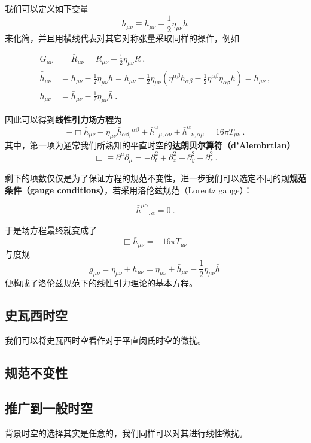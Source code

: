 我们可以定义如下变量
\begin{equation}
\bar{h}_{\mu\nu} \equiv h_{\mu\nu} - \frac{1}{2}\eta_{\mu\nu}h~
\end{equation}
来化简，并且用横线代表对其它对称张量采取同样的操作，例如

\begin{align}
G_{\mu\nu} &= \bar{R}_{\mu\nu} = R_{\mu\nu}- \frac{1}{2}\eta_{\mu\nu}R~,\\
\bar{\bar{h}}_{\mu\nu} &= \bar{h}_{\mu\nu} - \frac{1}{2}\eta_{\mu\nu}\bar{h} = \bar{h}_{\mu\nu} - \frac{1}{2}\eta_{\mu\nu} (\eta^{\alpha\beta}h_{\alpha\beta}-\frac{1}{2}\eta^{\alpha\beta}\eta_{\alpha\beta}h)= h_{\mu\nu}~,\\
h_{\mu\nu} &= \bar{h}_{\mu\nu} - \frac{1}{2}\eta_{\mu\nu} \bar{h}~.
\end{align}

因此可以得到\textbf{线性引力场方程}为
\begin{equation}
-\Box{\bar{h}_{\mu \nu}}-\eta_{\mu \nu} \bar{h}_{\alpha \beta,}{ }^{\alpha \beta} + \bar{h}^{\alpha}{ }_{\mu,\alpha\nu} + \bar{h}^{\alpha}{ }_{\nu,\alpha\mu}=16 \pi T_{\mu \nu}~.
\end{equation}
其中，第一项为通常我们所熟知的平直时空的\textbf{达朗贝尔算符（d'Alembrtian）}
$$
\Box \equiv  \partial^\mu\partial_\mu =  - \partial_t^2 + \partial_x^2 +\partial_y^2 + \partial_z^2~.
$$

剩下的项数仅仅是为了保证方程的规范不变性，进一步我们可以选定不同的规\textbf{规范条件（gauge conditions）}，若采用洛伦兹规范（Lorentz gauge）：

\begin{equation}
\bar{h}^{\mu\alpha}{ }_{,\alpha}=0~.
\end{equation}

于是场方程最终就变成了
\begin{equation}
\Box\bar{h}_{\mu\nu} = -16\pi T_{\mu\nu}~
\end{equation}
与度规
\begin{equation}
g_{\mu\nu}= \eta_{\mu\nu} + h_{\mu\nu}=\eta_{\mu\nu} + \bar{h}_{\mu\nu} - \frac{1}{2}\eta_{\mu\nu} \bar{h}~
\end{equation}
便构成了洛伦兹规范下的线性引力理论的基本方程。


\subsection{史瓦西时空}

我们可以将史瓦西时空看作对于平直闵氏时空的微扰。


\subsection{规范不变性}


\subsection{推广到一般时空}

背景时空的选择其实是任意的，我们同样可以对其进行线性微扰。

